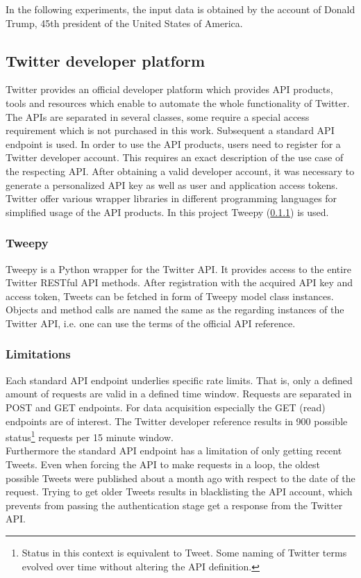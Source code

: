\documentclass[conference]{IEEEtran}
\begin{document}
In the following experiments, the input data is obtained by the account of Donald Trump, 45th president of the United States of America.

\subsection{Twitter developer platform}\label{subsec_twitter}

Twitter provides an official developer platform which provides API products, tools and resources which enable to automate the whole functionality of Twitter. The APIs are separated in several classes, some require a special access requirement which is not purchased in this work. Subsequent a standard API endpoint is used. In order to use the API products, users need to register for a Twitter developer account. This requires an exact description of the use case of the respecting API. After obtaining a valid developer account, it was necessary to generate a personalized API key as well as user and application access tokens. Twitter offer various wrapper libraries in different programming languages for simplified usage of the API products. In this project Tweepy (\ref{subsubsec_tweepy}) is used. \cite{tweepy}

\subsubsection{Tweepy}\label{subsubsec_tweepy}

Tweepy is a Python wrapper for the Twitter API. It provides access to the entire Twitter RESTful API methods. After registration with the acquired API key and access token, Tweets can be fetched in form of Tweepy model class instances. Objects and method calls are named the same as the regarding instances of the Twitter API, i.e. one can use the terms of the official API reference.

\subsubsection{Limitations}

Each standard API endpoint underlies specific rate limits. That is, only a defined amount of requests are valid in a defined time window. Requests are separated in POST and GET endpoints. For data acquisition especially the GET (read) endpoints are of interest. The Twitter developer reference results in 900 possible status\footnote{Status in this context is equivalent to Tweet. Some naming of Twitter terms evolved over time without altering the API definition.} requests per 15 minute window.\\
Furthermore the standard API endpoint has a limitation of only getting recent Tweets. Even when forcing the API to make requests in a loop, the oldest possible Tweets were published about a month ago with respect to the date of the request. Trying to get older Tweets results in blacklisting the API account, which prevents from passing the authentication stage get a response from the Twitter API. 
\end{document}
